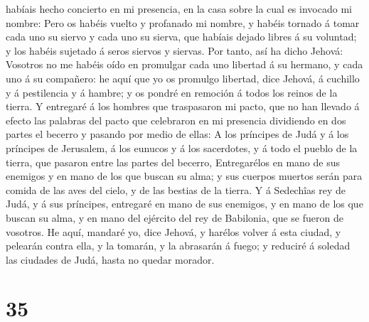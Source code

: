 habíais hecho concierto en mi presencia, en la casa sobre la cual es
invocado mi nombre:  Pero os habéis vuelto y profanado mi
nombre, y habéis tornado á tomar cada uno su siervo y cada uno su
sierva, que habíais dejado libres á su voluntad; y los habéis sujetado á
seros siervos y siervas.  Por tanto, así ha dicho Jehová:
Vosotros no me habéis oído en promulgar cada uno libertad á su hermano,
y cada uno á su compañero: he aquí que yo os promulgo libertad, dice
Jehová, á cuchillo y á pestilencia y á hambre; y os pondré en remoción á
todos los reinos de la tierra.  Y entregaré á los hombres
que traspasaron mi pacto, que no han llevado á efecto las palabras del
pacto que celebraron en mi presencia dividiendo en dos partes el becerro
y pasando por medio de ellas:  A los príncipes de Judá y
á los príncipes de Jerusalem, á los eunucos y á los sacerdotes, y á todo
el pueblo de la tierra, que pasaron entre las partes del becerro,
 Entregarélos en mano de sus enemigos y en mano de los
que buscan su alma; y sus cuerpos muertos serán para comida de las aves
del cielo, y de las bestias de la tierra.  Y á Sedechîas
rey de Judá, y á sus príncipes, entregaré en mano de sus enemigos, y en
mano de los que buscan su alma, y en mano del ejército del rey de
Babilonia, que se fueron de vosotros.  He aquí, mandaré
yo, dice Jehová, y harélos volver á esta ciudad, y pelearán contra ella,
y la tomarán, y la abrasarán á fuego; y reduciré á soledad las ciudades
de Judá, hasta no quedar morador.

\hypertarget{section-34}{%
\section{35}\label{section-34}}

